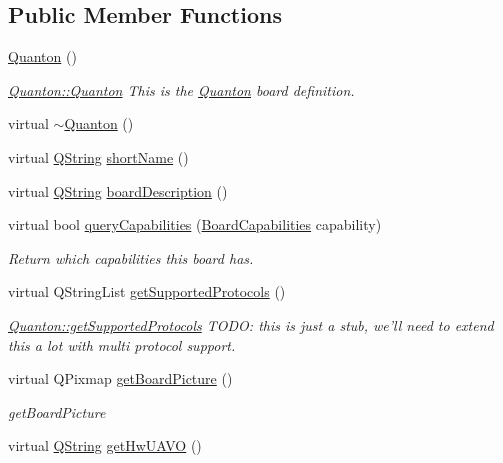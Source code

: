 \subsection*{\-Public \-Member \-Functions}
\begin{DoxyCompactItemize}
\item 
\hyperlink{group___boards___quantec_ga39ce601b1744d463fc4a56681c46135f}{\-Quanton} ()
\begin{DoxyCompactList}\small\item\em \hyperlink{group___boards___quantec_ga39ce601b1744d463fc4a56681c46135f}{\-Quanton\-::\-Quanton} \-This is the \hyperlink{class_quanton}{\-Quanton} board definition. \end{DoxyCompactList}\item 
virtual \hyperlink{group___boards___quantec_ga8fdeca3eefac72603d963569a4ef7a5d}{$\sim$\-Quanton} ()
\item 
virtual \hyperlink{group___u_a_v_objects_plugin_gab9d252f49c333c94a72f97ce3105a32d}{\-Q\-String} \hyperlink{group___boards___quantec_gab687582af9051f5955c3c797244dcb64}{short\-Name} ()
\item 
virtual \hyperlink{group___u_a_v_objects_plugin_gab9d252f49c333c94a72f97ce3105a32d}{\-Q\-String} \hyperlink{group___boards___quantec_gae3241fa8f27da1d6e9e01e92be744d71}{board\-Description} ()
\item 
virtual bool \hyperlink{group___boards___quantec_gafceea1eeec5e241c7526b8217b6d9ff9}{query\-Capabilities} (\hyperlink{group___core_plugin_ga01b09218f2a13aaeee6db007ac6bd967}{\-Board\-Capabilities} capability)
\begin{DoxyCompactList}\small\item\em \-Return which capabilities this board has. \end{DoxyCompactList}\item 
virtual \-Q\-String\-List \hyperlink{group___boards___quantec_ga8e7000bd17a41b004dbb8e9639387eb1}{get\-Supported\-Protocols} ()
\begin{DoxyCompactList}\small\item\em \hyperlink{group___boards___quantec_ga8e7000bd17a41b004dbb8e9639387eb1}{\-Quanton\-::get\-Supported\-Protocols} \-T\-O\-D\-O\-: this is just a stub, we'll need to extend this a lot with multi protocol support. \end{DoxyCompactList}\item 
virtual \-Q\-Pixmap \hyperlink{group___boards___quantec_gabf4519ffd0e2aaa2c692d9ec58b3bfd1}{get\-Board\-Picture} ()
\begin{DoxyCompactList}\small\item\em get\-Board\-Picture \end{DoxyCompactList}\item 
virtual \hyperlink{group___u_a_v_objects_plugin_gab9d252f49c333c94a72f97ce3105a32d}{\-Q\-String} \hyperlink{group___boards___quantec_gaf97ebd024db824870ba29203fd6d0bb6}{get\-Hw\-U\-A\-V\-O} ()
\end{DoxyCompactItemize}


